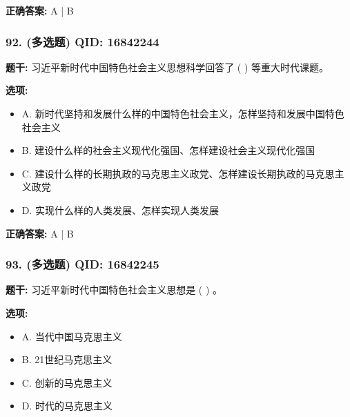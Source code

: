 \documentclass[12pt,UTF8]{ctexart}
\begin{document}
\textbf{正确答案:}
A | B

\vspace{0.3em}\hrulefill\vspace{0.7em}

\subsubsection*{92. (多选题) \small QID: 16842244}

\textbf{题干:}
习近平新时代中国特色社会主义思想科学回答了 ( ) 等重大时代课题。

\textbf{选项:}
\begin{itemize}[leftmargin=*]

  \item A. 新时代坚持和发展什么样的中国特色社会主义，怎样坚持和发展中国特色社会主义

  \item B. 建设什么样的社会主义现代化强国、怎样建设社会主义现代化强国

  \item C. 建设什么样的长期执政的马克思主义政党、怎样建设长期执政的马克思主义政党

  \item D. 实现什么样的人类发展、怎样实现人类发展

\end{itemize}

\textbf{正确答案:}
A | B

\vspace{0.3em}\hrulefill\vspace{0.7em}

\subsubsection*{93. (多选题) \small QID: 16842245}

\textbf{题干:}
习近平新时代中国特色社会主义思想是 ( ) 。

\textbf{选项:}
\begin{itemize}[leftmargin=*]

  \item A. 当代中国马克思主义

  \item B. 21世纪马克思主义

  \item C. 创新的马克思主义

  \item D. 时代的马克思主义

\end{itemize}
\end{document}
